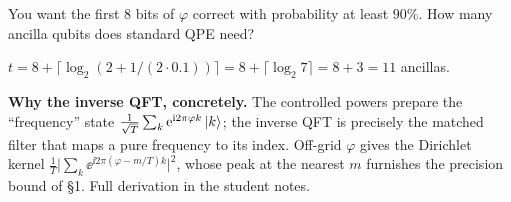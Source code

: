 \documentclass[11pt]{article}
\begin{document}
\begin{inclass}\label{ic:l4-count}
You want the first $8$ bits of $\varphi$ correct with probability at least $90\%$. How many
ancilla qubits does standard QPE need?
\end{inclass}
\begin{answer}
$t=8+\lceil\log_2(2+1/(2\cdot0.1))\rceil=8+\lceil\log_2 7\rceil=8+3=11$ ancillas.
\end{answer}

\begin{advanced}
\textbf{Why the inverse QFT, concretely.} The controlled powers prepare the ``frequency''
state $\tfrac1{\sqrt T}\sum_k\mathrm{e}^{\mathrm{i}2\pi\varphi k}\ket k$; the inverse QFT is precisely the
matched filter that maps a pure frequency to its index. Off-grid $\varphi$ gives the
Dirichlet kernel $\tfrac1T\big|\sum_k\ee^{\ii2\pi(\varphi-m/T)k}\big|^2$, whose peak at the
nearest $m$ furnishes the precision bound of \S1. Full derivation in the student notes.
\end{advanced}
\end{document}
